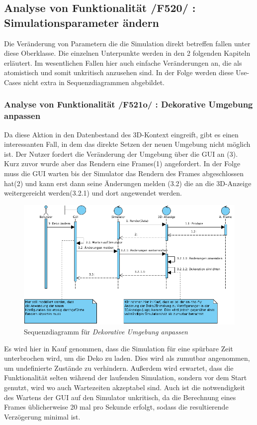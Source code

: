 \subsection{Analyse von Funktionalität /F520/ :  Simulationsparameter ändern}
Die Veränderung von Parametern die die Simulation direkt betreffen fallen unter diese Oberklasse. Die einzelnen Unterpunkte werden in den 2 folgenden Kapiteln erläutert. Im wesentlichen Fallen hier 
auch einfache Veränderungen an, die als atomistisch und somit unkritisch anzusehen sind. In der Folge werden diese Use-Cases nicht extra in Sequenzdiagrammen abgebildet.
\subsubsection{Analyse von Funktionalität /F521o/ :  Dekorative Umgebung anpassen}
Da diese Aktion in den Datenbestand des 3D-Kontext eingreift, gibt es einen interessanten Fall, in dem das direkte Setzen der neuen Umgebung nicht möglich ist. 
Der Nutzer fordert die Veränderung der Umgebung über die GUI an (3). Kurz zuvor wurde aber das Rendern eine Frames(1) angefordert. 
In der Folge muss die GUI warten bis der Simulator das Rendern des Frames abgeschlossen hat(2) und kann erst dann seine Änderungen melden (3.2) die an die 3D-Anzeige weitergereicht werden(3.2.1) und dort angewendet werden.

\begin{figure}[h!]
\includegraphics[width=\linewidth]{bilder/change_graphic_deko}
\caption{Sequenzdiagramm für \textit{Dekorative Umgebung anpassen}}
\end{figure}
Es wird hier in Kauf genommen, dass die Simulation für eine spürbare Zeit unterbrochen wird, um die Deko zu laden. Dies wird als zumutbar angenommen, um undefinierte Zustände zu verhindern. 
Außerdem wird erwartet, dass die Funktionalität selten während der laufenden Simulation, sondern vor dem Start genutzt, wird wo auch Wartezeiten akzeptabel sind.
Auch ist die notwendigkeit des Wartens der GUI auf den Simulator unkritisch, da die Berechnung eines Frames üblicherweise 20 mal pro Sekunde erfolgt, sodass die resultierende Verzögerung minimal ist.

